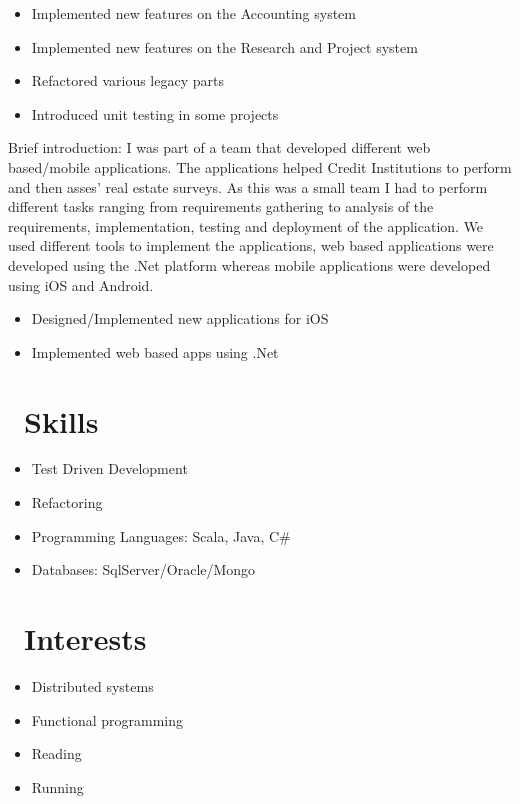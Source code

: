 \documentclass{resume}
\begin{document}
{\begin{itemize}
  \item Implemented new features on the Accounting system
  \item Implemented new features on the Research and Project system
  \item Refactored various legacy parts
  \item Introduced unit testing in some projects
\end{itemize}

Brief introduction: I was part of a team that developed different web based/mobile applications.
The applications helped Credit Institutions to perform and then asses’ real estate surveys.
As this was a small team I had to perform different tasks ranging from requirements gathering to analysis of the requirements, implementation, testing and deployment of the application.
We used different tools to implement the applications, web based applications were developed using the .Net platform whereas mobile applications were developed using iOS and Android.

\begin{itemize}
  \item Designed/Implemented new applications for iOS
  \item Implemented web based apps using .Net
\end{itemize}


\section{\faCogs\ Skills}
\begin{itemize}[parsep=0.5ex]
  \item Test Driven Development
  \item Refactoring
  \item Programming Languages: Scala, Java, C\#
  \item Databases: SqlServer/Oracle/Mongo
\end{itemize}

\section{\faHeartO\ Interests}
\begin{itemize}[parsep=0.5ex]
  \item Distributed systems
  \item Functional programming
  \item Reading
  \item Running
\end{itemize}

}
\end{document}

